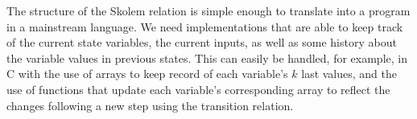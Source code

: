 

The structure of the Skolem relation is simple enough to translate
into a program in a mainstream language.
We need implementations that are able to keep track of the
current state variables, the current inputs, as well as some history
about the variable values in previous states. This can easily be handled, for
example, in C with the use of arrays to keep record of each variable's $k$ last
values, and the use of functions that update each variable's corresponding array
to reflect the changes following a new step using the transition relation.
